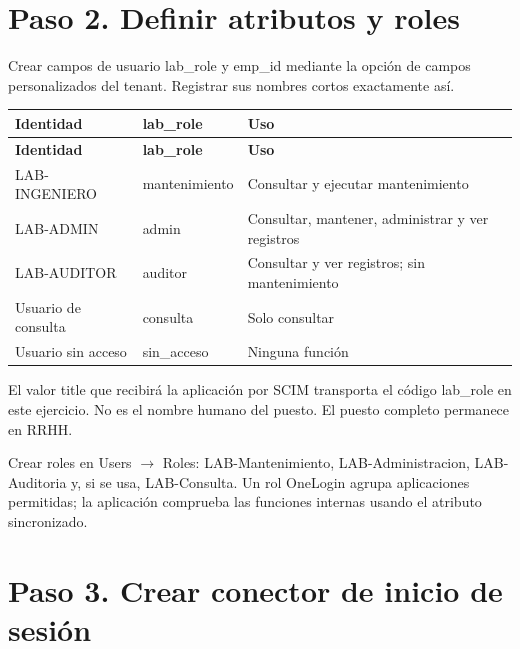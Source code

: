 \documentclass[12pt,a4paper]{article}
\begin{document}
\section*{Paso 2. Definir atributos y roles}
Crear campos de usuario \textnormal{lab\_\allowbreak{}role} y \textnormal{emp\_\allowbreak{}id} mediante la opción de campos personalizados del tenant. Registrar sus nombres cortos exactamente así.\par
{\small\renewcommand{\arraystretch}{1.2}
\begin{longtable}{p{5.027cm}p{5.027cm}p{5.027cm}}
\toprule
\textbf{Identidad} & \textbf{lab\_role} & \textbf{Uso} \\ \midrule\endfirsthead
\textbf{Identidad} & \textbf{lab\_role} & \textbf{Uso} \\ \midrule\endhead
LAB-INGENIERO & mantenimiento & Consultar y ejecutar mantenimiento \\
LAB-ADMIN & admin & Consultar, mantener, administrar y ver registros \\
LAB-AUDITOR & auditor & Consultar y ver registros; sin mantenimiento \\
Usuario de consulta & consulta & Solo consultar \\
Usuario sin acceso & sin\_acceso & Ninguna función \\
\bottomrule\end{longtable}}
El valor \textnormal{title} que recibirá la aplicación por SCIM transporta el código \textnormal{lab\_\allowbreak{}role} en este ejercicio. No es el nombre humano del puesto. El puesto completo permanece en RRHH.\par
Crear roles en Users \(\rightarrow\) Roles: \textnormal{LAB-Mantenimiento}, \textnormal{LAB-Administracion}, \textnormal{LAB-Auditoria} y, si se usa, \textnormal{LAB-Consulta}. Un rol OneLogin agrupa aplicaciones permitidas; la aplicación comprueba las funciones internas usando el atributo sincronizado.\par
{}\section*{Paso 3. Crear conector de inicio de sesión}
\end{document}
